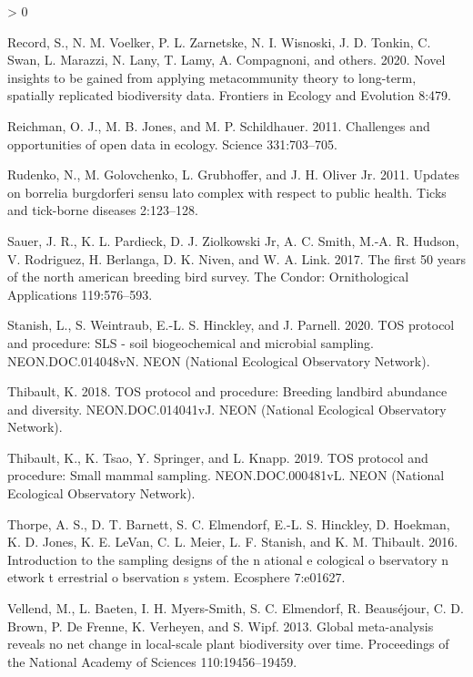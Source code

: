 \documentclass[
  12pt,
]{article}
\newlength{\cslhangindent}
\newenvironment{CSLReferences}[2] %
 {%
  \setlength{\parindent}{0pt}
  \ifodd #1 \everypar{\setlength{\hangindent}{\cslhangindent}}\ignorespaces\fi
  \ifnum #2 > 0
  \setlength{\parskip}{#2\baselineskip}
  \fi
 }%
 {}
\begin{document}
\begin{CSLReferences}{1}{0}
\leavevmode\hypertarget{ref-record2020novel}{}%
Record, S., N. M. Voelker, P. L. Zarnetske, N. I. Wisnoski, J. D. Tonkin, C. Swan, L. Marazzi, N. Lany, T. Lamy, A. Compagnoni, and others. 2020. Novel insights to be gained from applying metacommunity theory to long-term, spatially replicated biodiversity data. Frontiers in Ecology and Evolution 8:479.

\leavevmode\hypertarget{ref-reichman2011challenges}{}%
Reichman, O. J., M. B. Jones, and M. P. Schildhauer. 2011. Challenges and opportunities of open data in ecology. Science 331:703--705.

\leavevmode\hypertarget{ref-rudenko2011updates}{}%
Rudenko, N., M. Golovchenko, L. Grubhoffer, and J. H. Oliver Jr. 2011. Updates on borrelia burgdorferi sensu lato complex with respect to public health. Ticks and tick-borne diseases 2:123--128.

\leavevmode\hypertarget{ref-sauer2017first}{}%
Sauer, J. R., K. L. Pardieck, D. J. Ziolkowski Jr, A. C. Smith, M.-A. R. Hudson, V. Rodriguez, H. Berlanga, D. K. Niven, and W. A. Link. 2017. The first 50 years of the north american breeding bird survey. The Condor: Ornithological Applications 119:576--593.

\leavevmode\hypertarget{ref-Stanish2020}{}%
Stanish, L., S. Weintraub, E.-L. S. Hinckley, and J. Parnell. 2020. TOS protocol and procedure: SLS - soil biogeochemical and microbial sampling. NEON.DOC.014048vN. NEON (National Ecological Observatory Network).

\leavevmode\hypertarget{ref-thibault2018TOS}{}%
Thibault, K. 2018. TOS protocol and procedure: Breeding landbird abundance and diversity. NEON.DOC.014041vJ. NEON (National Ecological Observatory Network).

\leavevmode\hypertarget{ref-thibault2019TOS}{}%
Thibault, K., K. Tsao, Y. Springer, and L. Knapp. 2019. TOS protocol and procedure: Small mammal sampling. NEON.DOC.000481vL. NEON (National Ecological Observatory Network).

\leavevmode\hypertarget{ref-thorpe2016introduction}{}%
Thorpe, A. S., D. T. Barnett, S. C. Elmendorf, E.-L. S. Hinckley, D. Hoekman, K. D. Jones, K. E. LeVan, C. L. Meier, L. F. Stanish, and K. M. Thibault. 2016. Introduction to the sampling designs of the n ational e cological o bservatory n etwork t errestrial o bservation s ystem. Ecosphere 7:e01627.

\leavevmode\hypertarget{ref-vellend2013global}{}%
Vellend, M., L. Baeten, I. H. Myers-Smith, S. C. Elmendorf, R. Beauséjour, C. D. Brown, P. De Frenne, K. Verheyen, and S. Wipf. 2013. Global meta-analysis reveals no net change in local-scale plant biodiversity over time. Proceedings of the National Academy of Sciences 110:19456--19459.


\end{CSLReferences}
\end{document}
